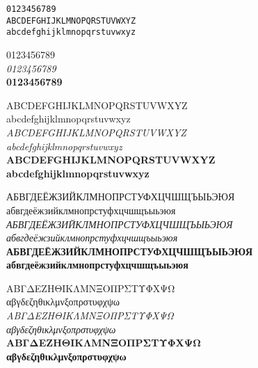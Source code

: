 \documentclass[10pt]{lecturenotes}
\begin{document}
\begin{sloppypar}
\begin{figure}[ht]
\begin{minipage}[b]{0.45\linewidth}
\end{minipage}
\hspace{0.5cm}
\begin{minipage}[b]{0.45\linewidth}

\noindent
\texttt{0123456789}\\


\noindent\texttt{ABCDEFGHIJKLMNOPQRSTUVWXYZ\\
abcdefghijklmnopqrstuvwxyz\\
}

\noindent
\textsf{
0123456789\\
\textit{0123456789}\\
\textbf{0123456789}\\
}

\noindent
\textsf{
ABCDEFGHIJKLMNOPQRSTUVWXYZ  \\
abcdefghijklmnopqrstuvwxyz  \\
\textit{ABCDEFGHIJKLMNOPQRSTUVWXYZ\\
abcdefghijklmnopqrstuvwxyz}\\
\textbf{ABCDEFGHIJKLMNOPQRSTUVWXYZ\\
abcdefghijklmnopqrstuvwxyz}\\
}

\noindent
\textsf{
АБВГДЕЁЖЗИЙКЛМНОПРСТУФХЦЧШЩЪЫЬЭЮЯ \\
абвгдеёжзийклмнопрстуфхцчшщъыьэюя \\
\textit{АБВГДЕЁЖЗИЙКЛМНОПРСТУФХЦЧШЩЪЫЬЭЮЯ\\
абвгдеёжзийклмнопрстуфхцчшщъыьэюя }\\
\textbf{АБВГДЕЁЖЗИЙКЛМНОПРСТУФХЦЧШЩЪЫЬЭЮЯ \\
абвгдеёжзийклмнопрстуфхцчшщъыьэюя }\\
}

\noindent
\textsf{
ΑΒΓΔΕΖΗΘΙΚΛΜΝΞΟΠΡΣΤΥΦΧΨΩ\\
αβγδεζηθικλμνξοπρστυφχψω\\
\textit{ΑΒΓΔΕΖΗΘΙΚΛΜΝΞΟΠΡΣΤΥΦΧΨΩ\\
αβγδεζηθικλμνξοπρστυφχψω}\\
\textbf{ΑΒΓΔΕΖΗΘΙΚΛΜΝΞΟΠΡΣΤΥΦΧΨΩ\\
αβγδεζηθικλμνξοπρστυφχψω}\\
}
\end{minipage}
\end{figure}



\end{sloppypar}
\end{document}

